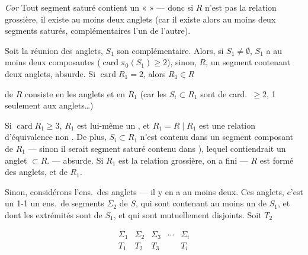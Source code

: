 \documentclass[11pt,a4paper]{article}
\begin{document}

\emph{Cor} Tout \struck{\ill{}} segment saturé contient un
«  » — donc si $R$ n'est pas la relation grossière, il
existe au moins deux anglets (car il existe alors au moins deux segments
saturés, complémentaires l'un de l'autre).


Soit \ill{} la réunion des anglets, $S_{1}$ son complémentaire. Alors, si
$S_{1}\neq\emptyset$, $S_{1}$ a au moins deux composantes
($\operatorname{card}\pi_{0}(S_{1})\geqslant2$), sinon, $R$, 
un segment contenant deux anglets, absurde. Si $\operatorname{card}R_{1}=2$,
alors $R_{1}\in R$ \ill{}

\struck{\ill{}} de $R$ consiste en les anglets et en $R_{1}$ (car les
$S_{i}\subset R_{1}$ sont de card.\ $\geqslant2$, \struck{\ill{}} \ill{}
1 seulement aux anglets…)

Si $\operatorname{card}R_{1}\geqslant3$, $R_{1}$ est lui-même un
, et $R_{1}=R\mid R_{1}$ est une relation d'équivalence
non . De plus, \struck{\ill{}} $S_{i}\subset R_{1}$ n'est
contenu dans un segment composant de $R_{1}$ — sinon il serait \ill{}
segment saturé contenu dans \ill{} \ill{} \ill{}), lequel contiendrait un
anglet $\subset R$. — absurde. Si $R_{1}$ est la relation grossière, on a
fini — $R$ est formé des anglets, et de $R_{1}$.

Sinon, considérons l'ens.\ des anglets \struck{\ill{}}
\add{\ill{}} — il y en a au moins deux. Ces anglets, \ill{} c'est un
 1-1 \ill{} un ens.\ de segments $\Sigma_{2}$ de $S$, qui
sont \ill{} contenant au moins un \ill{} de $S_{1}$, et dont les extrémités
sont  de $S_{1}$, et qui sont mutuellement disjoints.
Soit $T_{2}$ \ill{}

\[
  \begin{array}{ccccc}
    \Sigma_{1} & \Sigma_{2} & \Sigma_{3} & \cdots & \Sigma_{i}\\
    T_{1} & T_{2} & T_{3} & & T_{i}
  \end{array}
\]
\end{document}
